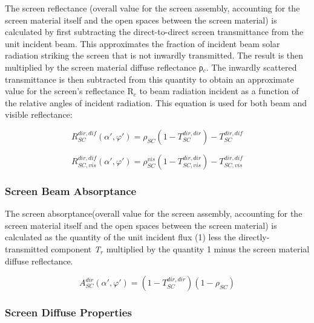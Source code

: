 The screen reflectance (overall value for the screen assembly, accounting for the screen material itself and the open spaces between the screen material) is calculated by first subtracting the direct-to-direct screen transmittance from the unit incident beam. This approximates the fraction of incident beam solar radiation striking the screen that is not inwardly transmitted. The result is then multiplied by the screen material diffuse reflectance ρ\(_{c}\). The inwardly scattered transmittance is then subtracted from this quantity to obtain an approximate value for the screen's reflectance R\(_{c}\) to beam radiation incident as a function of the relative angles of incident radiation. This equation is used for both beam and visible reflectance:

\begin{equation}
R_{SC}^{dir,dif}\left( {\alpha ',\varphi '} \right) = {\rho_{SC}}\left( {1 - T_{SC}^{dir,dir}} \right) - T_{SC}^{dir,dif}
\end{equation}

\begin{equation}
R_{SC,vis}^{dir,dif}\left( {\alpha ',\varphi '} \right) = \rho_{SC}^{vis}\left( {1 - T_{SC,vis}^{dir,dir}} \right) - T_{SC,vis}^{dir,dif}
\end{equation}

\subsubsection{Screen Beam Absorptance}\label{screen-beam-absorptance}

The screen absorptance(overall value for the screen assembly, accounting for the screen material itself and the open spaces between the screen material) is calculated as the quantity of the unit incident flux (1) less the directly-transmitted component \emph{T\(_{r}\)} multiplied by the quantity 1 minus the screen material diffuse reflectance.

\begin{equation}
A_{SC}^{dir}\left( {\alpha ',\varphi '} \right) = \left( {1 - T_{SC}^{dir,dir}} \right)\left( {1 - {\rho_{SC}}} \right)
\end{equation}

\subsubsection{Screen Diffuse Properties}\label{screen-diffuse-properties}


